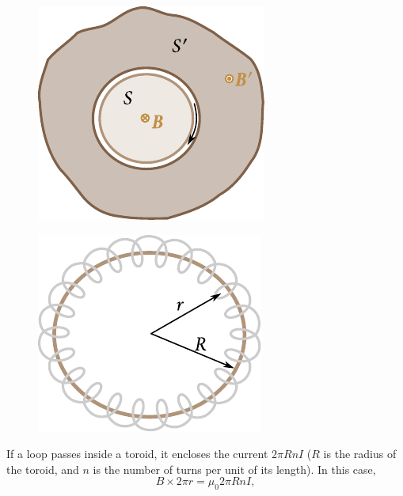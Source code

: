 \begin{figure}[t]
	\begin{minipage}[t]{0.48\linewidth}
		\begin{center}
			\includegraphics[scale=1]{figures/ch_06/fig_6_31.pdf}
			\caption[]{}
			\label{fig:6_31}
		\end{center}
	\end{minipage}
	\hfill{ }%
	\begin{minipage}[t]{0.48\linewidth}
		\begin{center}
			\includegraphics[scale=1]{figures/ch_06/fig_6_32.pdf}
			\caption[]{}
			\label{fig:6_32}
		\end{center}
	\end{minipage}
\vspace{-0.4cm}
\end{figure}

If a loop passes inside a toroid, it encloses the current $2\pi RnI$ ($R$ is the radius of the toroid, and $n$ is the number of turns per unit of its length). In this case,
\begin{equation*}
    B \times 2\pi r = \mu_0 2\pi R n I,
\end{equation*}

